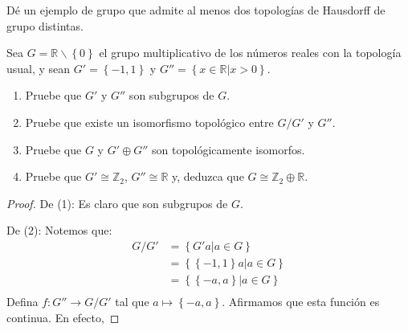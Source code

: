 \documentclass[12pt]{report}
\theoremstyle{largebreak}
\newcommand{\cf}[3]{\ensuremath{#1:#2\rightarrow#3}}
\begin{document}
    \begin{excer}
        Dé un ejemplo de grupo que admite al menos dos topologías de Hausdorff de grupo distintas. 
    \end{excer}

    \begin{sol}
        
    \end{sol}

    \begin{excer}
        Sea $G=\mathbb{R}\backslash\left\{0\right\}$ el grupo multiplicativo de los números reales con la topología usual, y sean $G'=\left\{-1,1\right\}$ y $G''=\left\{x\in \mathbb{R}\Big|x>0 \right\}$.
        \begin{enumerate}
            \item Pruebe que $G'$ y $G''$ son subgrupos de $G$.
            \item Pruebe que existe un isomorfismo topológico entre $G/G'$ y $G''$.
            \item Pruebe que $G$ y $G'\oplus G''$ son topológicamente isomorfos.
            \item Pruebe que $G'\cong \mathbb{Z}_2$, $G''\cong \mathbb{R}$ y, deduzca que $G\cong \mathbb{Z}_2\oplus \mathbb{R}$.
        \end{enumerate}
    \end{excer}

    \begin{proof}
        De (1): Es claro que son subgrupos de $G$.

        De (2): Notemos que:
        \begin{equation*}
            \begin{split}
                G/G'&=\left\{ G'a\Big|a\in G \right\}\\
                &=\left\{ \left\{-1,1\right\}a\Big|a\in G \right\}\\
                &=\left\{ \left\{-a,a\right\}\Big|a\in G \right\}\\
            \end{split}
        \end{equation*}
        Defina $\cf{f}{G''}{G/G'}$ tal que $a\mapsto \left\{-a,a\right\}$. Afirmamos que esta función es continua. En efecto, 
    \end{proof}
\end{document}
